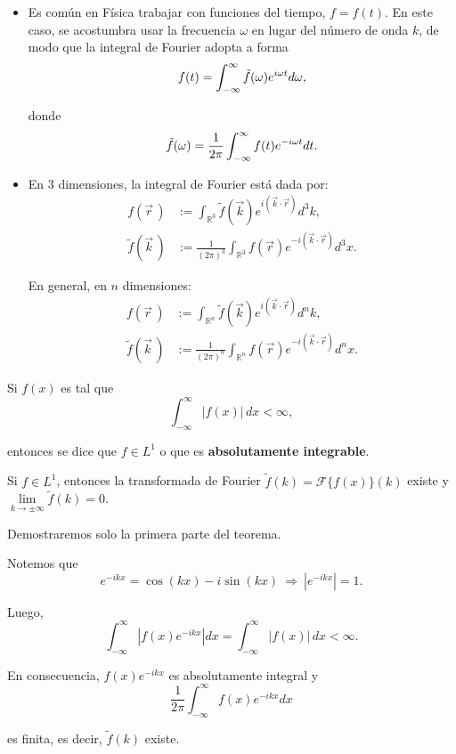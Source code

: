 \begin{itemize}
    \item Es común en Física trabajar con funciones del tiempo, $f = f(t)$. En este caso, se acostumbra usar la frecuencia $\omega$ en lugar del número de onda $k$, de modo que la integral de Fourier adopta a forma
    $$
    f(t) = \int_{- \infty}^{\infty} \Tilde{f}(\omega) e^{i \omega t} d\omega,
    $$

    donde
    $$
    \Tilde{f}(\omega) = \frac{1}{2\pi} \int_{- \infty}^{\infty} f(t) e^{- i \omega t} dt.
    $$
    
    \item En 3 dimensiones, la integral de Fourier está dada por:
    \begin{align*}
         f(\vec{r}\,) &:= \int_{\mathbb{R}^3} \tilde{f}(\vec{k}) e^{i (\vec{k} \cdot \vec{r})} d^3k, \\
         \tilde{f}(\vec{k}\,) &:= \frac{1}{(2\pi)^3} \int_{\mathbb{R}^3} f(\vec{r}) e^{-i (\vec{k} \cdot \vec{r})} d^3x.
    \end{align*}
    
    En general, en $n$ dimensiones:
     \begin{align*}
         f(\vec{r}\,) &:= \int_{\mathbb{R}^n} \tilde{f}(\vec{k}) e^{i (\vec{k} \cdot \vec{r})} d^n k, \\
         \tilde{f}(\vec{k}\,) &:= \frac{1}{(2\pi)^n} \int_{\mathbb{R}^n} f(\vec{r}) e^{-i (\vec{k} \cdot \vec{r})} d^n x.
    \end{align*}
   
\end{itemize}


\begin{defi}
Si $f(x)$ es tal que 
$$\int_{-\infty}^{\infty} |f(x)| \,dx < \infty,$$

entonces se dice que $f \in  L^1$ o que es \textbf{absolutamente integrable}.
\end{defi}

\begin{teorema}
Si $f \in L^1$, entonces la transformada de Fourier $\tilde{f}(k) = \mathcal{F}\{f(x)\}(k)$ existe y $\lim\limits_{k \to \pm \infty} \tilde{f}(k) = 0$.
\end{teorema}

\begin{demo}

Demostraremos solo la primera parte del teorema.

Notemos que
$$e^{-ikx} = \cos(kx) - i \sin(kx) ~\Rightarrow~ |e^{-ikx}| = 1.$$

Luego,
$$ \int_{-\infty}^{\infty} |f(x) e^{-ikx}| dx =  \int_{- \infty}^{\infty} |f(x)| \,dx < \infty.$$

En consecuencia, $f(x) e^{-ikx}$ es absolutamente integral y
$$\frac{1}{2\pi} \int_{-\infty}^{\infty} f(x) e^{-ikx} dx$$

es finita, es decir, $\tilde{f}(k)$ existe. 
\end{demo}

